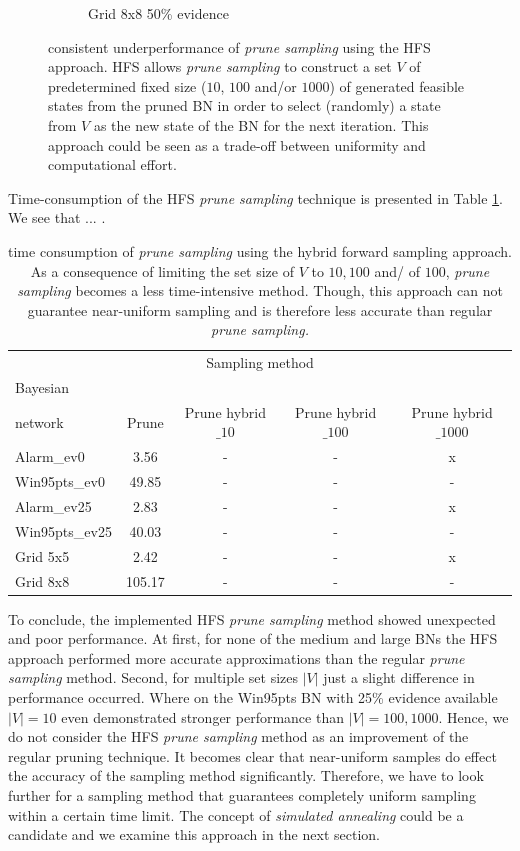 \documentclass[a4paper, twoside, 11pt]{report}
\theoremstyle{plain}
\theoremstyle{definition}
\theoremstyle{remark}
\newcommand{\ps}{\textit{prune sampling }}
\newcommand{\psp}{\textit{prune sampling. }}
\begin{document}
\begin{figure}[h!]
\begin{subfigure}{.5\linewidth}
\caption{Grid 8x8 50\% evidence}%
\label{grid_5x5}%
\end{subfigure}
\vspace{0.75pc}
\caption{consistent underperformance of \ps using the \gls{HFS} approach. HFS allows \ps to construct a set $V$ of predetermined fixed size ($10$, $100$ and/or $1000$) of generated feasible states from the pruned BN in order to select (randomly) a state from $V$ as the new state of the BN for the next iteration. This approach could be seen as a trade-off between uniformity and computational effort.}
\label{results7}
\end{figure}\vspace{1pc}

Time-consumption of the HFS \ps technique is presented in Table \ref{time-table2}. We see that ... .
\begin{center}
\begin{table}[t!]
\begin{center}
\begin{tabular}{l c c c c}  
\toprule
\multicolumn{5}{c}{Sampling method} \\
\cmidrule(r){2-5}
Bayesian \\ network    & Prune    & Prune hybrid$\_10$ & Prune hybrid$\_100$ & Prune hybrid$\_1000$  \\
\midrule
Alarm\_ev0 & 3.56 & - & - & x  \\
Win95pts\_ev0 & 49.85 & - & - & -  \\
Alarm\_ev25 & 2.83 & - & - & x \\
Win95pts\_ev25 & 40.03 & - & - & - \\
Grid 5x5 & 2.42 & - & - & x \\
Grid 8x8 & 105.17 & - & - & - \\
\bottomrule
\end{tabular}
\caption{time consumption of \ps using the hybrid forward sampling approach. As a consequence of limiting the set size of $V$ to $10, 100$ and/ of $100$, \ps becomes a less time-intensive method. Though, this approach can not guarantee near-uniform sampling and is therefore less accurate than regular \psp }
\label{time-table2}
\end{center}
\end{table}
\end{center}\newpage
To conclude, the implemented HFS \ps method showed unexpected and poor performance. At first, for none of the medium and large BNs the HFS approach performed more accurate approximations than the regular \ps method. Second, for multiple set sizes $|V|$ just a slight difference in performance occurred. Where on the Win95pts BN with 25\% evidence available $|V| = 10$ even demonstrated stronger performance than $|V| =100, 1000$. Hence, we do not consider the HFS \ps method as an improvement of the regular pruning technique. It becomes clear that near-uniform samples do effect the accuracy of the sampling method significantly. Therefore, we have to look further for a sampling method that guarantees completely uniform sampling within a certain time limit. The concept of \textit{simulated annealing} could be a candidate and we examine this approach in the next section.
\end{document}

